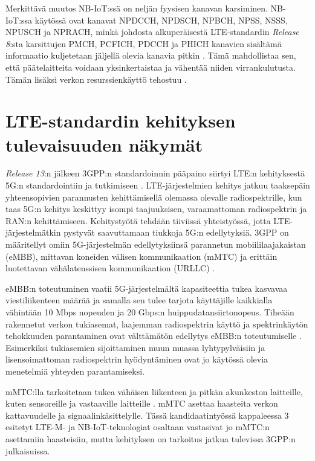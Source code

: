 \documentclass[finnish, 12pt, a4paper, elec, latin1, utf8, online]{aaltothesis}
\begin{document}
Merkittävä muutos NB-IoT:ssä on neljän fyysisen kanavan karsiminen. NB-IoT:ssa käytössä ovat kanavat NPDCCH, NPDSCH, NPBCH, NPSS, NSSS, NPUSCH ja NPRACH, minkä johdosta alkuperäisestä LTE-standardin \textit{Release 8}:sta karsittujen PMCH, PCFICH, PDCCH ja PHICH kanavien sisältämä informaatio kuljetetaan jäljellä olevia kanavia pitkin \cite{ETSIts36211, harmaala}. Tämä mahdollistaa sen, että päätelaitteita voidaan yksinkertaistaa ja vähentää niiden virrankulutusta. Tämän lisäksi verkon resurssienkäyttö tehostuu \cite{ratasuk2016nb, harmaala}.

\clearpage
\section{LTE-standardin kehityksen tulevaisuuden näkymät}

\textit{Release 13}:n jälkeen 3GPP:n standardoinnin pääpaino siirtyi LTE:n kehityksestä 5G:n standardointiin ja tutkimiseen \cite{ericssonRelease14}. LTE-järjestelmien kehitys jatkuu taaksepäin yhteensopivien parannusten kehittämisellä olemassa olevalle radiospektrille, kun taas 5G:n kehitys keskittyy isompi taajuuksisen, varaamattoman radiospektrin ja RAN:n kehittämiseen. Kehitystyötä tehdään tiiviissä yhteistyössä, jotta LTE-järjestelmätkin pystyvät saavuttamaan tiukkoja 5G:n edellytyksiä. 3GPP on määritellyt omiin 5G-järjestelmän edellytyksiinsä parannetun mobiililaajakaistan (eMBB), mittavan koneiden välisen kommunikaation (mMTC) ja erittäin luotettavan vähälatenssisen kommunikaation (URLLC) \cite{hoymann2016lte}.

eMBB:n toteutuminen vaatii 5G-järjestelmältä kapasiteettia tukea kasvavaa viestiliikenteen määrää ja samalla sen tulee tarjota käyttäjille kaikkialla vähintään 10 Mbps nopeuden ja 20 Gbps:n huippudatansiirtonopeus. Tiheään rakennetut verkon tukiasemat, laajemman radiospektrin käyttö ja spektrinkäytön tehokkuuden parantaminen ovat välttämätön edellytys eMBB:n toteutumiselle \cite{hoymann2016lte}. Esimerkiksi tukiasemien sijoittaminen muun muassa lyhtypylväisiin ja lisensoimattoman radiospektrin hyödyntäminen ovat jo käytössä olevia menetelmiä yhteyden parantamiseksi.

mMTC:lla tarkoitetaan tukea vähäisen liikenteen ja pitkän akunkeston laitteille, kuten sensoreille ja vastaaville laitteille \cite{hoymann2016lte}. mMTC asettaa haasteita verkon kattavuudelle ja signaalinkäsittelylle. Tässä kandidaatintyössä kappaleessa 3 esitetyt LTE-M- ja NB-IoT-teknologiat osaltaan vastasivat jo mMTC:n asettamiin haasteisiin, mutta kehityksen on tarkoitus jatkua tulevissa 3GPP:n julkaisuissa.
\end{document}
